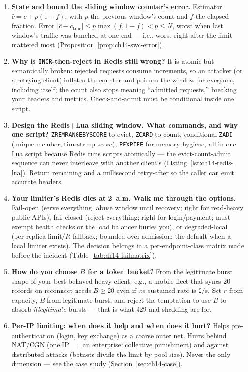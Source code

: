 \begin{enumerate}[label=\textbf{Q\arabic*.}, leftmargin=1.6cm, start=11]
  \item \textbf{State and bound the sliding window counter's error.}
        Estimator $\hat{c} = c + p(1-f)$, with $p$ the previous window's
        count and $f$ the elapsed fraction. Error
        $|\hat{c} - c_{\mathrm{true}}| \le p\max(f, 1-f) < p \le N$, worst
        when last window's traffic was bunched at one end --- i.e., worst
        right after the limit mattered most
        (Proposition~\ref{prop:ch14-swc-error}).
  \item \textbf{Why is \texttt{INCR}-then-reject in Redis still wrong?}
        It is atomic but semantically broken: rejected requests consume
        increments, so an attacker (or a retrying client) inflates the
        counter and poisons the window for everyone, including itself; the
        count also stops meaning ``admitted requests,'' breaking your
        headers and metrics. Check-and-admit must be conditional inside one
        script.
  \item \textbf{Design the Redis+Lua sliding window. What commands, and why
        one script?}
        \texttt{ZREMRANGEBYSCORE} to evict, \texttt{ZCARD} to count,
        conditional \texttt{ZADD} (unique member, timestamp score),
        \texttt{PEXPIRE} for memory hygiene, all in one Lua script because
        Redis runs scripts atomically --- the evict-count-admit sequence
        can never interleave with another client's
        (Listing~\ref{lst:ch14-redis-lua}). Return remaining and a
        millisecond retry-after so the caller can emit accurate headers.
  \item \textbf{Your limiter's Redis dies at 2~a.m. Walk me through the
        options.}
        Fail-open (serve everything; abuse window until recovery; right for
        read-heavy public APIs), fail-closed (reject everything; right for
        login/payment; must exempt health checks or the load balancer
        buries you), or degraded-local (per-replica $\mathrm{limit}/R$
        fallback; bounded over-admission; the default when a local limiter
        exists). The decision belongs in a per-endpoint-class matrix made
        before the incident (Table~\ref{tab:ch14-failmatrix}).
  \item \textbf{How do you choose $B$ for a token bucket?}
        From the legitimate burst shape of your best-behaved heavy client:
        e.g., a mobile fleet that syncs 20 records on reconnect needs
        $B \ge 20$ even if its sustained rate is 2/s. Set $r$ from
        capacity, $B$ from legitimate burst, and reject the temptation to
        use $B$ to absorb \emph{illegitimate} bursts --- that is what 429
        and shedding are for.
  \item \textbf{Per-IP limiting: when does it help and when does it hurt?}
        Helps pre-authentication (login, key exchange) as a coarse outer
        net. Hurts behind NAT/CGN (one IP $=$ an enterprise: collective
        punishment) and against distributed attacks (botnets divide the
        limit by pool size). Never the only dimension --- see the case
        study (Section~\ref{sec:ch14-case}).
\end{enumerate}

